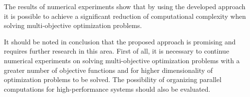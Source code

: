 \documentclass[runningheads]{llncs}
\begin{document}
The results of numerical experiments show that by using the developed approach it is possible to achieve a significant reduction of computational complexity when solving multi-objective optimization problems. 

It should be noted in conclusion that the proposed approach is promising and requires further research in this area. First of all, it is necessary to continue numerical experiments on solving multi-objective optimization problems with a greater number of objective functions and for higher dimensionality of optimization problems to be solved. The possibility of organizing parallel computations for high-performance systems should also be evaluated.


%
%
%
\end{document}
